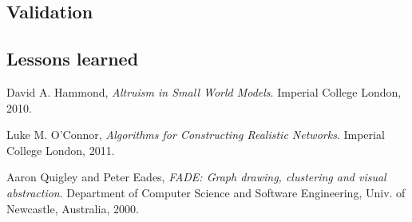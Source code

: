 \documentclass[a4paper,11pt,titlepage]{article}
\begin{document}
\subsection{Validation}

\subsection{Lessons learned}

\begin{thebibliography}{9}

  David A. Hammond,
  \emph{Altruism in Small World Models}.
  Imperial College London,
  2010.

  Luke M. O'Connor,
  \emph{Algorithms for Constructing Realistic Networks}.
  Imperial College London,
  2011.

  Aaron Quigley and Peter Eades,
  \emph{FADE: Graph drawing, clustering and visual abstraction}.
  Department of Computer Science and Software Engineering,
  Univ. of  Newcastle, Australia, 2000.

\end{thebibliography}
\end{document}
